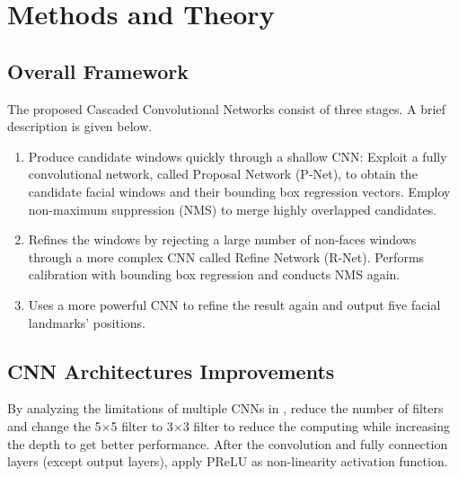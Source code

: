 \documentclass[journal, a4paper]{IEEEtran}
\begin{document}
\par

\section{Methods and Theory }\label{2}
\subsection{Overall Framework}
The proposed Cascaded Convolutional Networks consist of three stages. A brief description is given below.
\begin{enumerate}
	\item Produce candidate windows quickly through a shallow CNN: Exploit a fully convolutional network, called Proposal Network (P-Net), to obtain the candidate facial windows and their bounding box regression vectors. Employ non-maximum suppression (NMS) to merge highly overlapped candidates. 
	\item Refines the windows by rejecting a large number of non-faces windows through a more complex CNN called Refine Network (R-Net). Performs calibration with bounding box regression and conducts NMS again. 
	\item Uses a more powerful CNN to refine the result again and output five facial landmarks' positions.
\end{enumerate}
\subsection{CNN Architectures Improvements}
By analyzing the limitations of multiple CNNs in \cite{2}, reduce the number of filters and change the 5$\times$5 filter to 3$\times$3 filter to reduce the computing while increasing the depth to get better performance.  After the convolution and fully connection layers (except output layers),  apply PReLU \cite{3} as non-linearity activation function.  
\end{document}
